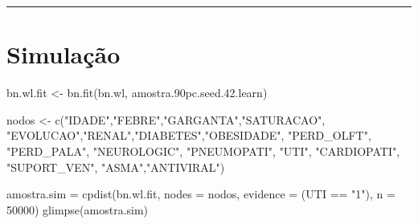 \documentclass[
]{article}
\newenvironment{Shaded}{\begin{snugshade}}{\end{snugshade}}
\newcommand{\AttributeTok}[1]{\textcolor[rgb]{0.77,0.63,0.00}{#1}}
\newcommand{\DecValTok}[1]{\textcolor[rgb]{0.00,0.00,0.81}{#1}}
\newcommand{\FloatTok}[1]{\textcolor[rgb]{0.00,0.00,0.81}{#1}}
\newcommand{\FunctionTok}[1]{\textcolor[rgb]{0.00,0.00,0.00}{#1}}
\newcommand{\NormalTok}[1]{#1}
\newcommand{\OtherTok}[1]{\textcolor[rgb]{0.56,0.35,0.01}{#1}}
\newcommand{\SpecialCharTok}[1]{\textcolor[rgb]{0.00,0.00,0.00}{#1}}
\newcommand{\StringTok}[1]{\textcolor[rgb]{0.31,0.60,0.02}{#1}}
\begin{document}
\begin{center}\rule{0.5\linewidth}{0.5pt}\end{center}

\hypertarget{simulauxe7uxe3o}{%
\section{Simulação}\label{simulauxe7uxe3o}}

\begin{Shaded}
\begin{Highlighting}[]
\NormalTok{bn.wl.fit }\OtherTok{\textless{}{-}} \FunctionTok{bn.fit}\NormalTok{(bn.wl, amostra}\FloatTok{.90}\NormalTok{pc.seed.}\FloatTok{42.}\NormalTok{learn)}

\NormalTok{nodos }\OtherTok{\textless{}{-}} \FunctionTok{c}\NormalTok{(}\StringTok{"IDADE"}\NormalTok{,}\StringTok{"FEBRE"}\NormalTok{,}\StringTok{"GARGANTA"}\NormalTok{,}\StringTok{"SATURACAO"}\NormalTok{,}
             \StringTok{"EVOLUCAO"}\NormalTok{,}\StringTok{"RENAL"}\NormalTok{,}\StringTok{"DIABETES"}\NormalTok{,}\StringTok{"OBESIDADE"}\NormalTok{,}
             \StringTok{"PERD\_OLFT"}\NormalTok{, }\StringTok{"PERD\_PALA"}\NormalTok{, }\StringTok{"NEUROLOGIC"}\NormalTok{,}
             \StringTok{"PNEUMOPATI"}\NormalTok{,}
             \StringTok{"UTI"}\NormalTok{,}
             \StringTok{"CARDIOPATI"}\NormalTok{,}
             \StringTok{"SUPORT\_VEN"}\NormalTok{, }\StringTok{"ASMA"}\NormalTok{,}\StringTok{"ANTIVIRAL"}\NormalTok{)}
\end{Highlighting}
\end{Shaded}

\begin{Shaded}
\begin{Highlighting}[]
\NormalTok{amostra.sim }\OtherTok{=} \FunctionTok{cpdist}\NormalTok{(bn.wl.fit, }
                          \AttributeTok{nodes =}\NormalTok{ nodos, }
                          \AttributeTok{evidence =}\NormalTok{ (UTI }\SpecialCharTok{==} \StringTok{"1"}\NormalTok{),}
                     \AttributeTok{n =} \DecValTok{50000}\NormalTok{)}
\FunctionTok{glimpse}\NormalTok{(amostra.sim)}
\end{Highlighting}
\end{Shaded}
\end{document}
